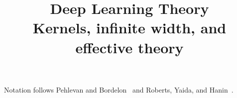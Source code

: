 

\title{Deep Learning Theory\\[0.4em]
\large Kernels, infinite width, and effective theory}
\author{}
\date{}


\maketitle
\vspace{-1.4em}
\begin{center}
\small Notation follows Pehlevan and Bordelon~\cite{pehlevan2023infinite}
and Roberts, Yaida, and Hanin~\cite{roberts2022pdlt}.
\end{center}

\tableofcontents
\newpage











\appendix






